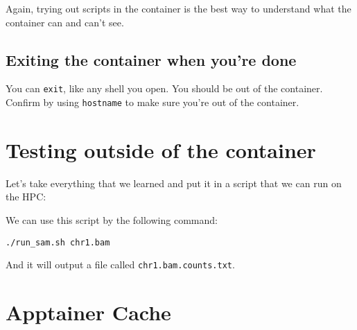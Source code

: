 \documentclass[
  letterpaper,
  DIV=11,
  numbers=noendperiod]{scrreprt}
\newenvironment{Shaded}{\begin{snugshade}}{\end{snugshade}}
\newcommand{\AttributeTok}[1]{\textcolor[rgb]{0.40,0.45,0.13}{#1}}
\newcommand{\CommentTok}[1]{\textcolor[rgb]{0.37,0.37,0.37}{#1}}
\newcommand{\ExtensionTok}[1]{\textcolor[rgb]{0.00,0.23,0.31}{#1}}
\newcommand{\NormalTok}[1]{\textcolor[rgb]{0.00,0.23,0.31}{#1}}
\newcommand{\OperatorTok}[1]{\textcolor[rgb]{0.37,0.37,0.37}{#1}}
\newcommand{\VariableTok}[1]{\textcolor[rgb]{0.07,0.07,0.07}{#1}}
\begin{document}
Again, trying out scripts in the container is the best way to understand
what the container can and can't see.

\subsection{Exiting the container when you're
done}\label{exiting-the-container-when-youre-done}

You can \texttt{exit}, like any shell you open. You should be out of the
container. Confirm by using \texttt{hostname} to make sure you're out of
the container.

\section{Testing outside of the
container}\label{testing-outside-of-the-container}

Let's take everything that we learned and put it in a script that we can
run on the HPC:

\begin{Shaded}
\end{Shaded}

We can use this script by the following command:

\begin{verbatim}
./run_sam.sh chr1.bam 
\end{verbatim}

And it will output a file called \texttt{chr1.bam.counts.txt}.

\section{Apptainer Cache}\label{apptainer-cache}
\end{document}
